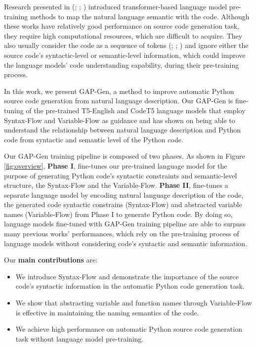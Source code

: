 \documentclass[11pt]{article}
\begin{document}
Research presented in (\citealp[]{Clement2020PyMT5MT}; \citealp[]{Feng2020CodeBERTAP}; \citealp[]{Lu2021CodeXGLUEAM}) introduced transformer-based language model pre-training methods to map the natural language semantic with the code. Although these works have relatively good performance on source code generation task, they require high computational resources, which are difficult to acquire. They also usually consider the code as a sequence of tokens (\citealp[]{Feng2020CodeBERTAP}; \citealp[]{kanade2020learning}; \citealp[]{Lu2021CodeXGLUEAM}) and ignore either the source code's syntactic-level or semantic-level information, which could improve the language models' code understanding capability, during their pre-training process. 



In this work, we present GAP-Gen, a method to improve automatic Python source code generation from natural language description. Our GAP-Gen is fine-tuning of the pre-trained T5-English \citep{raffel2020exploring} and CodeT5 \citep{wang2021codet5} language models that employ Syntax-Flow and Variable-Flow as guidance and has shown on being able to understand the relationship between natural language description and Python code from syntactic and semantic level of the Python code. 

Our GAP-Gen training pipeline is composed of two phases. As shown in Figure \ref{fig:overview}, \textbf{Phase I}, fine-tunes our pre-trained language model for the purpose of generating Python code's syntactic constraints and semantic-level structure, the Syntax-Flow and the Variable-Flow. \textbf{Phase II}, fine-tunes a separate language model by encoding natural language description of the code, the generated code syntactic constrains (Syntax-Flow) and abstracted variable names (Variable-Flow) from Phase I to generate Python code. By doing so, language models fine-tuned with GAP-Gen training pipeline are able to surpass many previous works' performances, which rely on the pre-training process of language models without considering code's syntactic and semantic information.














Our \textbf{main contributions} are:
\begin{itemize}
\item We introduce Syntax-Flow and demonstrate the importance of the source code's syntactic information in the automatic Python code generation task.
\item We show that abstracting variable and function names through Variable-Flow is effective in maintaining the naming semantics of the code.
\item We achieve high performance on automatic Python source code generation task without language model pre-training.

\end{itemize}
\end{document}
